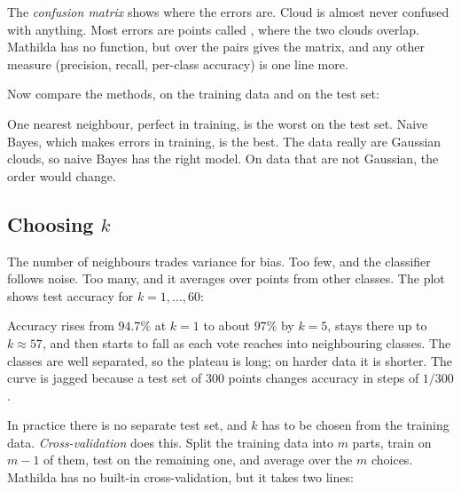 The \emph{confusion matrix} shows where the errors are.
Cloud  is almost never confused with anything. Most errors are
 points called , where the two clouds overlap. Mathilda has
no  function, but  over the pairs gives the
matrix, and any other measure (precision, recall, per-class accuracy) is one line
more.

Now compare the methods, on the training data and on the test set:

\begin{codepairs}
\end{codepairs}

One nearest neighbour, perfect in training, is the worst on the test set.
Naive Bayes, which makes errors in training, is the best. The data
really are Gaussian clouds, so naive Bayes has the right model. On data that are
not Gaussian, the order would change.

\subsection{Choosing \texorpdfstring{\(k\)}{k}}
\label{ssec:ml-choosek}

The number of neighbours trades variance for bias. Too few, and the classifier
follows noise. Too many, and it averages over points from other classes. The plot
shows test accuracy for \(k = 1, \dots, 60\):


Accuracy rises from \(94.7\%\) at \(k=1\) to about \(97\%\) by \(k=5\),
stays there up to \(k \approx 57\), and then starts to fall as each vote reaches
into neighbouring classes. The classes are well separated, so the plateau is
long; on harder data it is shorter. The curve is jagged because a test set of 300
points changes accuracy in steps of \(1/300\).

In practice there is no separate test set, and \(k\) has to be chosen from the
training data. \emph{Cross-validation} does this. Split the
training data into \(m\) parts, train on \(m-1\) of them, test on the remaining
one, and average over the \(m\) choices. Mathilda has no built-in cross-validation,
but it takes two lines:

\begin{codepairs}
\end{codepairs}

